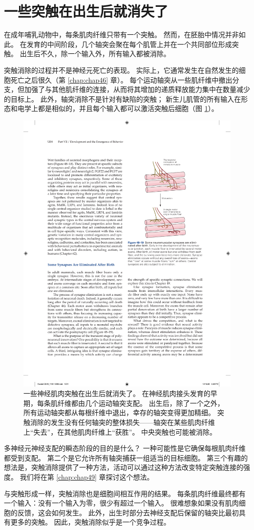 \section{一些突触在出生后就消失了}

在成年哺乳动物中，每条肌肉纤维只带有一个突触。 然而，在胚胎中情况并非如此。 在发育的中间阶段，几个轴突会聚在每个肌管上并在一个共同部位形成突触。 出生后不久，除一个输入外，所有输入都被消除。

突触消除的过程并不是神经元死亡的表现。 实际上，它通常发生在自然发生的细胞死亡之后很久（第 \ref{chap:chap46} 章）。 每个运动轴突从一些肌纤维中撤出分支，但加强了与其他肌纤维的连接，从而将其增加的递质释放能力集中在数量减少的目标上。 
此外，轴突消除不是针对有缺陷的突触； 新生儿肌管的所有输入在形态和电学上都是相似的，并且每个输入都可以激活突触后细胞（图 \ref{fig:48_19}）。

\begin{figure}[htbp]
	\centering
	\includegraphics[width=0.4\linewidth]{chap48/fig_48_19}
	\caption{一些神经肌肉突触在出生后就消失了。 在神经肌肉接头发育的早期，每条肌纤维都由几个运动轴突支配。 出生后，除了一个之外，所有运动轴突都从每根纤维中退出，幸存的轴突变得更加精细。 突触消除的发生没有任何轴突的整体损失——轴突在某些肌肉纤维上“失去”，在其他肌肉纤维上“获胜”。 中央突触也可能被消除。}
	\label{fig:48_19}
\end{figure}

多神经元神经支配的瞬态阶段的目的是什么？ 一种可能性是它确保每根肌肉纤维都受到支配。 第二个是它允许所有轴突捕获一组适当的目标细胞。 第三个有趣的想法是，突触消除提供了一种方法，活动可以通过这种方法改变特定突触连接的强度。 我们将在第 \ref{chap:chap49} 章探讨这个想法。

与突触形成一样，突触消除也是细胞间相互作用的结果。 每条肌肉纤维最终都有一个输入：没有一个输入为零，很少有超过一个输入。 很难想象如果没有肌肉细胞的反馈，这会如何发生。 此外，出生时部分去神经支配后保留的轴突比最初具有更多的突触。 因此，突触消除似乎是一个竞争过程。

